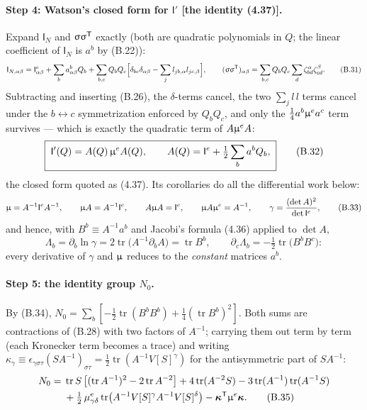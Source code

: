 \paragraph{Step 4: Watson's closed form for $\mathsf I'$ [the identity (4.37)].}
Expand $\mathsf I_N$ and $\upsigma\upsigma^{\mathsf T}$ exactly (both are quadratic polynomials in $Q$; the linear coefficient of $\mathsf I_N$ is $a^b$ by (B.22)):
\begin{equation}
\mathsf I_{N,\alpha\beta}=\mathsf I^{e}_{\alpha\beta}+\sum_ba^{b}_{\alpha\beta}Q_b
+\sum_{b,c}Q_bQ_c\Bigl[\delta_{bc}\delta_{\alpha\beta}-\sum_jl_{jb,\alpha}l_{jc,\beta}\Bigr],
\qquad
(\upsigma\upsigma^{\mathsf T})_{\alpha\beta}=\sum_{b,c}Q_bQ_c\sum_d\zeta^{\alpha}_{bd}\zeta^{\beta}_{cd}. \tag{B.31}
\end{equation}
Subtracting and inserting (B.26), the $\delta$-terms cancel, the two $\sum_jl\,l$ terms cancel under the $b\!\leftrightarrow\!c$ symmetrization enforced by $Q_bQ_c$, and only the $\tfrac14a^b\upmu^{e}a^c$ term survives --- which is exactly the quadratic term of $A\upmu^{e}A$:
\begin{equation}
\boxed{\;\mathsf I'(Q)=A(Q)\,\upmu^{e}A(Q),\qquad A(Q)=\mathsf I^{e}+\tfrac12\sum_ba^{b}Q_b ,\;} \tag{B.32}
\end{equation}
the closed form quoted as (4.37). Its corollaries do all the differential work below:
\begin{equation}
\upmu=A^{-1}\mathsf I^{e}A^{-1},\qquad
\upmu A=A^{-1}\mathsf I^{e},\qquad
A\upmu A=\mathsf I^{e},\qquad
\upmu A\upmu^{e}=A^{-1},\qquad
\gamma=\frac{(\det A)^{2}}{\det\mathsf I^{e}} , \tag{B.33}
\end{equation}
and hence, with $B^{b}\equiv A^{-1}a^{b}$ and Jacobi's formula (4.36) applied to $\det A$,
\begin{equation}
\Lambda_b=\partial_b\ln\gamma=2\operatorname{tr}\bigl(A^{-1}\partial_bA\bigr)=\operatorname{tr}B^{b},
\qquad
\partial_c\Lambda_b=-\tfrac12\operatorname{tr}\bigl(B^{b}B^{c}\bigr): \tag{B.34}
\end{equation}
every derivative of $\gamma$ and $\upmu$ reduces to the \emph{constant} matrices $a^{b}$.

\paragraph{Step 5: the identity group $N_0$.}
By (B.34), $N_0=\sum_b[-\tfrac12\operatorname{tr}(B^bB^b)+\tfrac14(\operatorname{tr}B^b)^2]$. Both sums are contractions of (B.28) with two factors of $A^{-1}$; carrying them out term by term (each Kronecker term becomes a trace) and writing $\kappa_\gamma\equiv\epsilon_{\gamma\sigma\tau}(SA^{-1})_{\sigma\tau}=\tfrac12\operatorname{tr}(A^{-1}V[S]^{\gamma})$ for the antisymmetric part of $SA^{-1}$:
\begin{align}
N_0=\;&\operatorname{tr}S\,\bigl[(\operatorname{tr}A^{-1})^{2}-2\operatorname{tr}A^{-2}\bigr]
+4\operatorname{tr}(A^{-2}S)-3\operatorname{tr}(A^{-1})\operatorname{tr}(A^{-1}S)\nonumber\\
&+\tfrac12\,\mu^{e}_{\gamma\delta}\operatorname{tr}\bigl(A^{-1}V[S]^{\gamma}A^{-1}V[S]^{\delta}\bigr)
-\boldsymbol\kappa^{\mathsf T}\upmu^{e}\boldsymbol\kappa . \tag{B.35}
\end{align}

